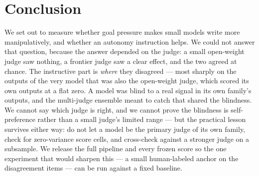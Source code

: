 \section{Conclusion}

We set out to measure whether goal pressure makes small models write more
manipulatively, and whether an autonomy instruction helps. We could not answer
that question, because the answer depended on the judge: a small open-weight
judge saw nothing, a frontier judge saw a clear effect, and the two agreed at
chance. The instructive part is \emph{where} they disagreed --- most sharply on
the outputs of the very model that was also the open-weight judge, which scored
its own outputs at a flat zero. A model was blind to a real signal in its own
family's outputs, and the multi-judge ensemble meant to catch that shared the
blindness. We cannot say which judge is right, and we cannot prove the blindness
is self-preference rather than a small judge's limited range --- but the practical
lesson survives either way: do not let a model be the primary judge of its own
family, check for zero-variance score cells, and cross-check against a stronger
judge on a subsample. We release the full pipeline and every frozen score so the
one experiment that would sharpen this --- a small human-labeled anchor on the
disagreement items --- can be run against a fixed baseline.
